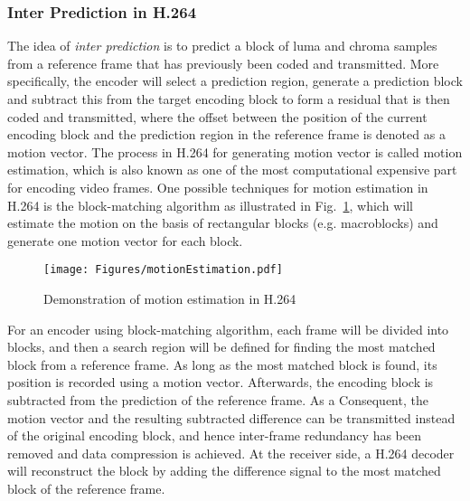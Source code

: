 \subsubsection{Inter Prediction in H.264}
\label{sec::MEIntro}
%
The idea of \emph{inter prediction} is to predict a block of luma and chroma samples from a reference frame that has previously been coded and transmitted.
More specifically, the encoder will select a prediction region, generate a prediction block and subtract this from the target encoding block to form a residual that is then coded and transmitted, where the offset between the position of the current encoding block and the prediction region in the reference frame is denoted as a motion vector.
The process in H.264 for generating motion vector is called motion estimation, which is also known as one of the most computational expensive part for encoding video frames.
One possible techniques for motion estimation in H.264 is the block-matching algorithm as illustrated in Fig.~\ref{fig::MEIntro}, which will estimate the motion on the basis of rectangular blocks (e.g. macroblocks) and generate one motion vector for each block.
%
\begin{figure}
\begin{center}
\texttt{[image: Figures/motionEstimation.pdf]}
\caption{\label{fig::MEIntro}Demonstration of motion estimation in H.264}
\end{center}
\end{figure}
%

For an encoder using block-matching algorithm, each frame will be divided into blocks, and then a search region will be defined for finding the most matched block from a reference frame.
As long as the most matched block is found, its position is recorded using a motion vector.
Afterwards, the encoding block is subtracted from the prediction of the reference frame. As a Consequent, the motion vector and the resulting subtracted difference can be transmitted instead of the original encoding block, and hence inter-frame redundancy has been removed and data compression is achieved.
At the receiver side, a H.264 decoder will reconstruct the block by adding the difference signal to the most matched block of the reference frame.